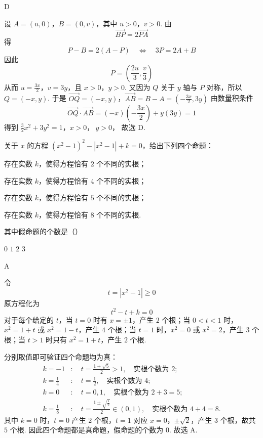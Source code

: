 \begin{answer}
D
\end{answer}

\begin{solution}
设 \(A=(u,0)\)，\(B=(0,v)\)，其中 \(u>0\)，\(v>0\). 由
\[
\overrightarrow{BP}=2\overrightarrow{PA}
\]
得
\[
P-B=2(A-P)\quad\Longleftrightarrow\quad 3P=2A+B
\]
因此
\[
P=\left(\frac{2u}{3},\frac{v}{3}\right)
\]
从而 \(u=\frac{3x}{2}\)，\(v=3y\)，且 \(x>0\)，\(y>0\). 又因为 \(Q\) 关于 \(y\) 轴与 \(P\) 对称，所以 \(Q=(-x,y)\). 于是
\(\overrightarrow{OQ}=(-x,y)\)，\(\overrightarrow{AB}=B-A=\left(-\frac{3x}{2},3y\right)\)
由数量积条件
\[
\overrightarrow{OQ}\cdot\overrightarrow{AB}
=(-x)\left(-\frac{3x}{2}\right)+y(3y)=1
\]
得到
\(\frac{3}{2}x^2+3y^2=1\)，\(x>0\)，\(\ y>0\)，
故选 D.
\end{solution}

\begin{problem}
关于 \(x\) 的方程 \((x^{2} - 1)^{2} - |x^{2} - 1| + k = 0\)，给出下列四个命题：

\begin{circlelist}
\item 存在实数 \(k\)，使得方程恰有 \(2\) 个不同的实根；
\item 存在实数 \(k\)，使得方程恰有 \(4\) 个不同的实根；
\item 存在实数 \(k\)，使得方程恰有 \(5\) 个不同的实根；
\item 存在实数 \(k\)，使得方程恰有 \(8\) 个不同的实根.
\end{circlelist}

其中假命题的个数是（\quad）

\choices
    {\(0\)}
    {\(1\)}
    {\(2\)}
    {\(3\)}
\end{problem}

\begin{answer}
A
\end{answer}

\begin{solution}
令
\[
t=|x^2-1|\geqslant0
\]
原方程化为
\[
t^2-t+k=0
\]
对于每个给定的 \(t\)，当 \(t=0\) 时有 \(x=\pm1\)，产生 \(2\) 个根；当 \(0<t<1\) 时，\(x^2=1+t\) 或 \(x^2=1-t\)，产生 \(4\) 个根；当 \(t=1\) 时，\(x^2=0\) 或 \(x^2=2\)，产生 \(3\) 个根；当 \(t>1\) 时只有 \(x^2=1+t\)，产生 \(2\) 个根.

分别取值即可验证四个命题均为真：
\[
\begin{aligned}
k=-1&:\quad t=\frac{1+\sqrt5}{2}>1,\quad \text{实根个数为 }2;\\
k=\frac14&:\quad t=\frac12,\quad \text{实根个数为 }4;\\
k=0&:\quad t=0,1,\quad \text{实根个数为 }2+3=5;\\
k=\frac18&:\quad t=\frac{1\pm\sqrt{\frac{1}{2}}}2\in(0,1),\quad \text{实根个数为 }4+4=8.
\end{aligned}
\]
其中 \(k=0\) 时，\(t=0\) 产生 \(2\) 个根，\(t=1\) 对应 \(x=0\)，\(\pm\sqrt2\)，产生 \(3\) 个根，故共 \(5\) 个根. 因此四个命题都是真命题，假命题的个数为 \(0\). 故选 A.
\end{solution}

